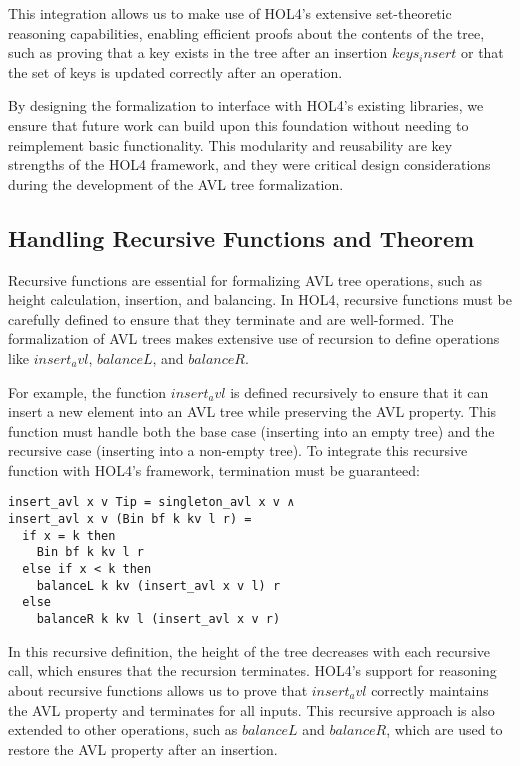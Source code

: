 \documentclass[12pt]{article}
\begin{document}
\begin{itemize}
This integration allows us to make use of HOL4’s extensive set-theoretic reasoning capabilities, enabling efficient proofs about the contents of the tree, such as proving that a key exists in the tree after an insertion \(keys_insert\) or that the set of keys is updated correctly after an operation.

By designing the formalization to interface with HOL4’s existing libraries, we ensure that future work can build upon this foundation without needing to reimplement basic functionality. This modularity and reusability are key strengths of the HOL4 framework, and they were critical design considerations during the development of the AVL tree formalization.

\subsection{Handling Recursive Functions and Theorem}

Recursive functions are essential for formalizing AVL tree operations, such as height calculation, insertion, and balancing. In HOL4, recursive functions must be carefully defined to ensure that they terminate and are well-formed. The formalization of AVL trees makes extensive use of recursion to define operations like \(insert_avl\), \(balanceL\), and \(balanceR\).

For example, the function \(insert_avl\) is defined recursively to ensure that it can insert a new element into an AVL tree while preserving the AVL property. This function must handle both the base case (inserting into an empty tree) and the recursive case (inserting into a non-empty tree). To integrate this recursive function with HOL4’s framework, termination must be guaranteed:

\begin{verbatim}
insert_avl x v Tip = singleton_avl x v ∧  
insert_avl x v (Bin bf k kv l r) =
  if x = k then
    Bin bf k kv l r  
  else if x < k then
    balanceL k kv (insert_avl x v l) r  
  else
    balanceR k kv l (insert_avl x v r)
\end{verbatim}

In this recursive definition, the height of the tree decreases with each recursive call, which ensures that the recursion terminates. HOL4’s support for reasoning about recursive functions allows us to prove that \(insert_avl\) correctly maintains the AVL property and terminates for all inputs. This recursive approach is also extended to other operations, such as \(balanceL\) and \(balanceR\), which are used to restore the AVL property after an insertion.


\end{itemize}
\end{document}
